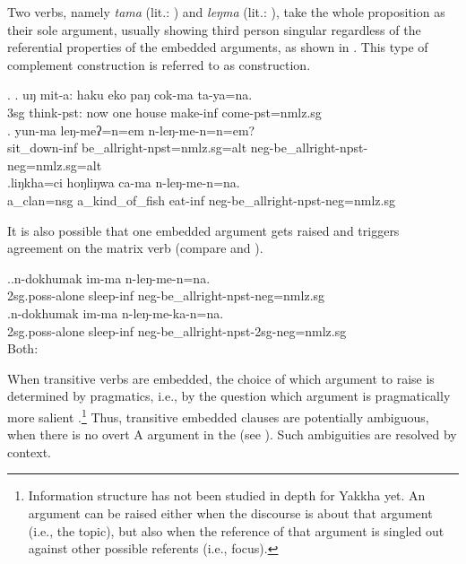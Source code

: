 Two verbs, namely \emph{tama}  (lit.: ) and \emph{leŋma}  (lit.: ), take the whole proposition as their sole argument, usually showing third person singular  regardless of the referential properties of the embedded arguments, as shown in \Next. This type of complement construction is referred to as  construction.

\ex. \ag. uŋ mit-a:       haku eko paŋ  cok-ma    ta-ya=na.\\
	{\sc 3sg} think{\sc [3sg]-pst}: now one house make-{\sc inf} come{\sc [3sg]-pst=nmlz.sg}\\
	 
 	\bg. yun-ma leŋ-meʔ=n=em n-leŋ-me-n=n=em?\\
	sit\_down{\sc -inf} be\_allright{\sc [3sg]-npst=nmlz.sg=alt} {\sc neg-}be\_allright{\sc [3sg]-npst-neg=nmlz.sg=alt}\\
	\bg.liŋkha=ci hoŋliŋwa ca-ma n-leŋ-me-n=na.\\
	a\_clan{\sc =nsg} a\_kind\_of\_fish eat{\sc -inf}	{\sc neg-}be\_allright{\sc [3sg]-npst-neg=nmlz.sg}\\ 

It is also possible that one embedded argument gets raised and triggers agreement on the matrix verb (compare \Next[a] and \Next[b]). 

\ex.\ag.n-dokhumak im-ma n-leŋ-me-n=na.\\
{\sc 2sg.poss-}alone sleep{\sc -inf} {\sc neg-}be\_allright{\sc [3sg]-npst-neg=nmlz.sg}\\
\bg.n-dokhumak im-ma n-leŋ-me-ka-n=na.\\
{\sc 2sg.poss-}alone sleep{\sc -inf} {\sc neg-}be\_allright{\sc -npst-2sg-neg=nmlz.sg}\\
Both: 

\largerpage
When transitive verbs are embedded, the choice of which argument to raise is determined by pragmatics, i.e., by the question which argument is pragmatically more salient \Next.\footnote{Information structure has not been studied in depth for Yakkha yet. An argument can be raised either when the discourse is about that argument (i.e., the topic), but also when the reference of that argument is singled out against other possible referents (i.e., focus).} Thus, transitive embedded clauses are potentially  ambiguous, when there is no overt A argument in the  (see \Next[b]). Such ambiguities are resolved by context.

